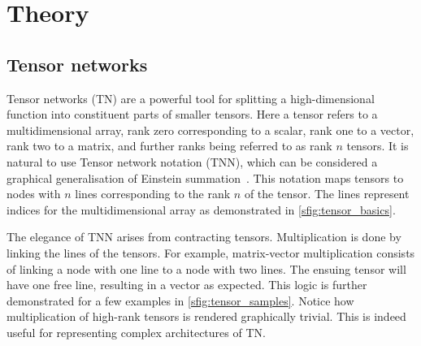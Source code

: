 

\section{Theory}

\subsection{Tensor networks}

Tensor networks (TN) are a powerful tool for splitting a high-dimensional function into constituent parts of smaller tensors. 
Here a tensor refers to a multidimensional array, rank zero corresponding to a scalar, rank one to a vector, rank two to a matrix, and further ranks being referred to as rank $n$ tensors.
It is natural to use Tensor network notation (TNN), which can be considered a graphical generalisation of Einstein summation~\cite{Bridgeman_2017}. This notation maps tensors to  nodes with $n$ lines corresponding to the rank $n$ of the tensor. The lines represent indices for the multidimensional array as demonstrated in \cref{sfig:tensor_basics}.

The elegance of TNN arises from contracting tensors. Multiplication is done by linking the lines of the tensors. For example, matrix-vector multiplication consists of linking a node with one line to a node with two lines. The ensuing tensor will have one free line, resulting in a vector as expected.
This logic is further demonstrated for a few examples in \cref{sfig:tensor_samples}.
Notice how multiplication of high-rank tensors is rendered graphically trivial. This is indeed useful for representing complex architectures of TN\@.



